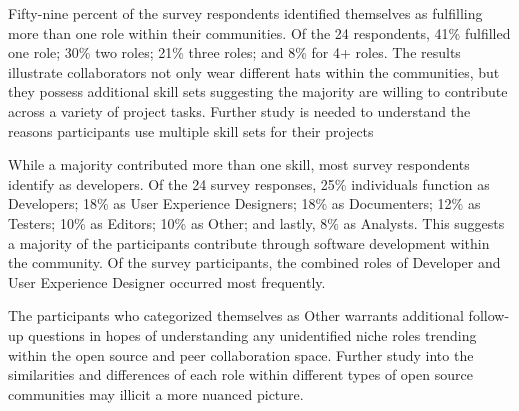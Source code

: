 Fifty-nine percent of the survey respondents identified themselves as fulfilling more than one 
role within their communities. Of the 24 respondents, 41\% fulfilled one role; 30\% two roles; 21\% three roles; and 8\% for 4+ roles. 
The results illustrate collaborators not only wear different hats within the communities, but they possess additional skill sets suggesting the majority 
are willing to contribute across a variety of project tasks. Further study is needed to understand the reasons participants use multiple skill sets for their projects  

While a majority contributed more than one skill, most survey respondents identify as developers. Of the 24 survey responses, 25\% individuals function as Developers; 
18\% as User Experience Designers; 18\% as Documenters; 12\% as Testers; 10\% as Editors; 10\% as Other; and lastly, 8\% as Analysts. This suggests a majority of the participants contribute through software development 
within the community. Of the survey participants, the combined roles of Developer and User Experience Designer occurred most frequently.  
 
The participants who categorized themselves as Other warrants additional follow-up questions in hopes of understanding any unidentified niche roles 
trending within the open source and peer collaboration space. Further study into the similarities and differences of each role within different types of open source 
communities may illicit a more nuanced picture.


